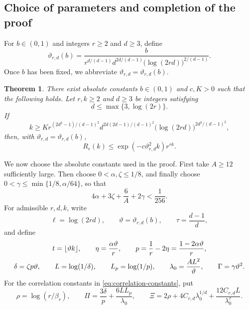 \documentclass[twoside,12pt]{article}
\newtheorem{theorem}{Theorem}[section]
\theoremstyle{definition}
\theoremstyle{remark}
\newcommand{\1}{\mathbf 1}
\begin{document}
\subsection{Choice of parameters and completion of the proof}
\label{sec:transfer-theorem}

For $b\in(0,1)$ and integers $r\ge2$ and $d\ge3$, define
\begin{equation}\label{eq:vartheta}
 \vartheta_{r,d}(b)=
 \frac{b}{
 r^{d/(d-1)}d^{2d/(d-1)}
 \bigl(\log(2rd)\bigr)^{2/(d-1)}}.
\end{equation}
Once $b$ has been fixed, we abbreviate
$\vartheta_{r,d}=\vartheta_{r,d}(b)$.

\begin{theorem}\label{thm:transfer}
There exist absolute constants $b\in(0,1)$ and $c,K>0$ such that the
following holds. Let $r,k\ge2$ and $d\ge3$ be integers satisfying
\[
 d\le\max\{3,\log(2r)\}.
\]
If
\begin{equation}\label{eq:transfer-threshold}
 k\ge
 K r^{(2d^2-1)/(d-1)^2}
 d^{2d(2d-1)/(d-1)^2}
 \bigl(\log(2rd)\bigr)^{2d^2/(d-1)^2},
\end{equation}
then, with $\vartheta_{r,d}=\vartheta_{r,d}(b)$,
\begin{equation}\label{eq:transfer-saving}
 R_r(k)\le
 \exp\!\left(-c\vartheta_{r,d}^2k\right)r^{rk}.
\end{equation}
\end{theorem}

We now choose the absolute constants used in the proof. First take $A\ge12$
sufficiently large. Then choose $0<\alpha,\zeta\le1/8$, and finally choose
$0<\gamma\le\min\{1/8,\alpha/64\}$, so that
\begin{equation}\label{eq:constant-choice}
 4\alpha+3\zeta+\frac6A+2\gamma<\frac1{256}.
\end{equation}
For admissible $r,d,k$, write
\[
 \ell=\log(2rd),
 \qquad
 \vartheta=\vartheta_{r,d}(b),
 \qquad
 \tau=\frac{d-1}{d},
\]
and define
\begin{gather}
 t=\lfloor\vartheta k\rfloor,
 \qquad
 \eta=\frac{\alpha\vartheta}{r},
 \qquad
 p=\frac1r-2\eta=\frac{1-2\alpha\vartheta}{r},
 \notag\\
 \delta=\zeta p\vartheta,
 \qquad
 L=\log(1/\delta),
 \qquad
 L_p=\log(1/p),
 \qquad
 \lambda_0=\frac{AL^2}{\vartheta},
 \qquad
 \Gamma=\gamma\vartheta^2.
 \label{eq:transfer-lambda-gamma}
\end{gather}
For the correlation constants in \eqref{eq:correlation-constants}, put
\begin{equation}\label{eq:transfer-rho-Pi-Xi}
 \rho=\log(r/\beta_r),
 \qquad
 \Pi=\frac{3\delta}{p}+\frac{6LL_p}{\lambda_0},
 \qquad
 \Xi=2\rho+4C_{r,d}\lambda_0^{1/d}
 +\frac{12C_{r,d}L}{\lambda_0^\tau}.
\end{equation}
\end{document}
